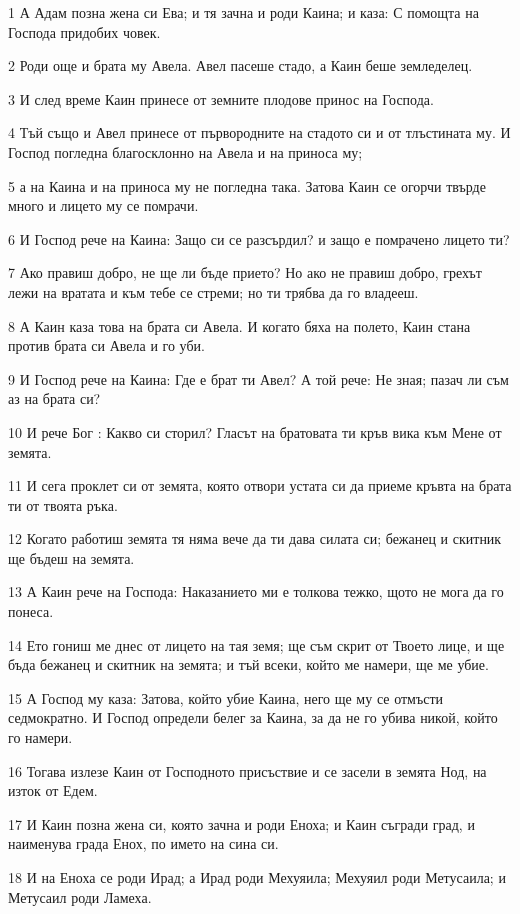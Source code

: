 \par 1 А Адам позна жена си Ева; и тя зачна и роди Каина; и каза: С помощта на Господа придобих човек.
\par 2 Роди още и брата му Авела. Авел пасеше стадо, а Каин беше земледелец.
\par 3 И след време Каин принесе от земните плодове принос на Господа.
\par 4 Тъй също и Авел принесе от първородните на стадото си и от тлъстината му. И Господ погледна благосклонно на Авела и на приноса му;
\par 5 а на Каина и на приноса му не погледна така. Затова Каин се огорчи твърде много и лицето му се помрачи.
\par 6 И Господ рече на Каина: Защо си се разсърдил? и защо е помрачено лицето ти?
\par 7 Ако правиш добро, не ще ли бъде прието? Но ако не правиш добро, грехът лежи на вратата и към тебе се стреми; но ти трябва да го владееш.
\par 8 А Каин каза това на брата си Авела. И когато бяха на полето, Каин стана против брата си Авела и го уби.
\par 9 И Господ рече на Каина: Где е брат ти Авел? А той рече: Не зная; пазач ли съм аз на брата си?
\par 10 И рече Бог : Какво си сторил? Гласът на братовата ти кръв вика към Мене от земята.
\par 11 И сега проклет си от земята, която отвори устата си да приеме кръвта на брата ти от твоята ръка.
\par 12 Когато работиш земята тя няма вече да ти дава силата си; бежанец и скитник ще бъдеш на земята.
\par 13 А Каин рече на Господа: Наказанието ми е толкова тежко, щото не мога да го понеса.
\par 14 Ето гониш ме днес от лицето на тая земя; ще съм скрит от Твоето лице, и ще бъда бежанец и скитник на земята; и тъй всеки, който ме намери, ще ме убие.
\par 15 А Господ му каза: Затова, който убие Каина, него ще му се отмъсти седмократно. И Господ определи белег за Каина, за да не го убива никой, който го намери.
\par 16 Тогава излезе Каин от Господното присъствие и се засели в земята Нод, на изток от Едем.
\par 17 И Каин позна жена си, която зачна и роди Еноха; и Каин съгради град, и наименува града Енох, по името на сина си.
\par 18 И на Еноха се роди Ирад; а Ирад роди Мехуяила; Мехуяил роди Метусаила; и Метусаил роди Ламеха.

